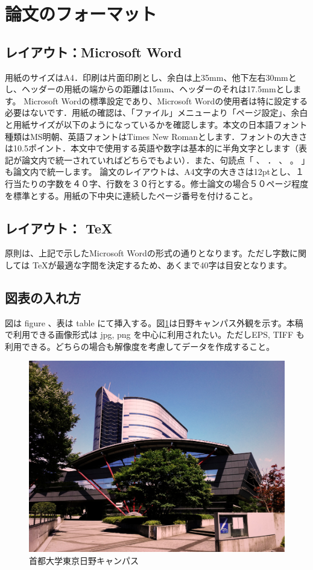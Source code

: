 \documentclass[a4paper]{jsarticle}
\begin{document}
\newpage

\section{論文のフォーマット}
\subsection{レイアウト：Microsoft Word}
用紙のサイズはA4．印刷は片面印刷とし、余白は上35mm、他下左右30mmとし、ヘッダーの用紙の端からの距離は15mm、ヘッダーのそれは17.5mmとします。
Microsoft Wordの標準設定であり、Microsoft Wordの使用者は特に設定する必要はないです．用紙の確認は、「ファイル」メニューより「ページ設定」、余白と用紙サイズが以下のようになっているかを確認します。本文の日本語フォント種類はMS明朝、英語フォントはTimes New Romanとします．フォントの大きさは10.5ポイント．本文中で使用する英語や数字は基本的に半角文字とします（表記が論文内で統一されていればどちらでもよい）．また、句読点「 、 ． 、 。 」も論文内で統一します。
論文のレイアウトは、A4文字の大きさは12ptとし、１行当たりの字数を４０字、行数を３０行とする。修士論文の場合５０ページ程度を標準とする。用紙の下中央に連続したページ番号を付けること。

\subsection{レイアウト： \TeX}
原則は、上記で示したMicrosoft Wordの形式の通りとなります。ただし字数に関しては \TeX が最適な字間を決定するため、あくまで40字は目安となります。

\subsection{図表の入れ方}
図は figure 、表は table にて挿入する。図\ref{fig:tmu_hino}は日野キャンパス外観を示す。本稿で利用できる画像形式は jpg, png を中心に利用されたい。ただしEPS, TIFF も利用できる。どちらの場合も解像度を考慮してデータを作成すること。
\begin{figure}[tb]
  \begin{center}
    \includegraphics[width=0.95\hsize]{./images/sample.jpg}
    \caption{首都大学東京日野キャンパス}
    \label{fig:tmu_hino}
  \end{center}
\end{figure}
\end{document}
